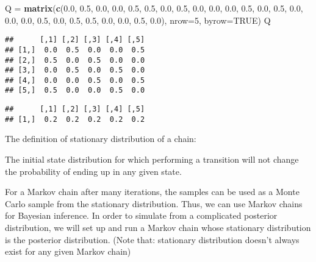\documentclass[]{book}
\newenvironment{Shaded}{\begin{snugshade}}{\end{snugshade}}
\newcommand{\KeywordTok}[1]{\textcolor[rgb]{0.13,0.29,0.53}{\textbf{#1}}}
\newcommand{\DataTypeTok}[1]{\textcolor[rgb]{0.13,0.29,0.53}{#1}}
\newcommand{\DecValTok}[1]{\textcolor[rgb]{0.00,0.00,0.81}{#1}}
\newcommand{\FloatTok}[1]{\textcolor[rgb]{0.00,0.00,0.81}{#1}}
\newcommand{\StringTok}[1]{\textcolor[rgb]{0.31,0.60,0.02}{#1}}
\newcommand{\OtherTok}[1]{\textcolor[rgb]{0.56,0.35,0.01}{#1}}
\newcommand{\OperatorTok}[1]{\textcolor[rgb]{0.81,0.36,0.00}{\textbf{#1}}}
\newcommand{\NormalTok}[1]{#1}
\begin{document}
\begin{Shaded}
\begin{Highlighting}[]
\NormalTok{Q =}\StringTok{ }\KeywordTok{matrix}\NormalTok{(}\KeywordTok{c}\NormalTok{(}\FloatTok{0.0}\NormalTok{, }\FloatTok{0.5}\NormalTok{, }\FloatTok{0.0}\NormalTok{, }\FloatTok{0.0}\NormalTok{, }\FloatTok{0.5}\NormalTok{,}
             \FloatTok{0.5}\NormalTok{, }\FloatTok{0.0}\NormalTok{, }\FloatTok{0.5}\NormalTok{, }\FloatTok{0.0}\NormalTok{, }\FloatTok{0.0}\NormalTok{,}
             \FloatTok{0.0}\NormalTok{, }\FloatTok{0.5}\NormalTok{, }\FloatTok{0.0}\NormalTok{, }\FloatTok{0.5}\NormalTok{, }\FloatTok{0.0}\NormalTok{,}
             \FloatTok{0.0}\NormalTok{, }\FloatTok{0.0}\NormalTok{, }\FloatTok{0.5}\NormalTok{, }\FloatTok{0.0}\NormalTok{, }\FloatTok{0.5}\NormalTok{,}
             \FloatTok{0.5}\NormalTok{, }\FloatTok{0.0}\NormalTok{, }\FloatTok{0.0}\NormalTok{, }\FloatTok{0.5}\NormalTok{, }\FloatTok{0.0}\NormalTok{), }
           \DataTypeTok{nrow=}\DecValTok{5}\NormalTok{, }\DataTypeTok{byrow=}\OtherTok{TRUE}\NormalTok{)}
\NormalTok{Q}
\end{Highlighting}
\end{Shaded}

\begin{verbatim}
##      [,1] [,2] [,3] [,4] [,5]
## [1,]  0.0  0.5  0.0  0.0  0.5
## [2,]  0.5  0.0  0.5  0.0  0.0
## [3,]  0.0  0.5  0.0  0.5  0.0
## [4,]  0.0  0.0  0.5  0.0  0.5
## [5,]  0.5  0.0  0.0  0.5  0.0
\end{verbatim}

\begin{Shaded}
\end{Shaded}

\begin{verbatim}
##      [,1] [,2] [,3] [,4] [,5]
## [1,]  0.2  0.2  0.2  0.2  0.2
\end{verbatim}

The definition of stationary distribution of a chain:

The initial state distribution for which performing a transition will
not change the probability of ending up in any given state.

For a Markov chain after many iterations, the samples can be used as a
Monte Carlo sample from the stationary distribution. Thus, we can use
Markov chains for Bayesian inference. In order to simulate from a
complicated posterior distribution, we will set up and run a Markov
chain whose stationary distribution is the posterior distribution. (Note
that: stationary distribution doesn't always exist for any given Markov
chain)
\end{document}
